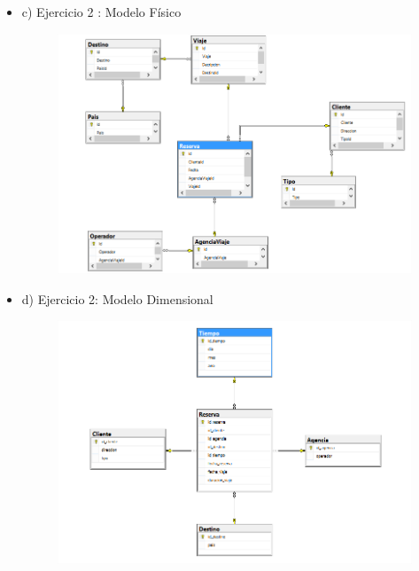 \begin{itemize}
	\item c) Ejercicio 2 : Modelo Físico 
		\begin{figure}[H]
		\begin{center}
		\includegraphics[width=18cm]{./Imagenes/imagen3}
		\end{center}
		\end{figure}
     
	\item d) Ejercicio 2:   Modelo Dimensional
		\begin{figure}[H]
		\begin{center}
		\includegraphics[width=18cm]{./Imagenes/imagen4}
		\end{center}
		\end{figure}
     

\end{itemize}
